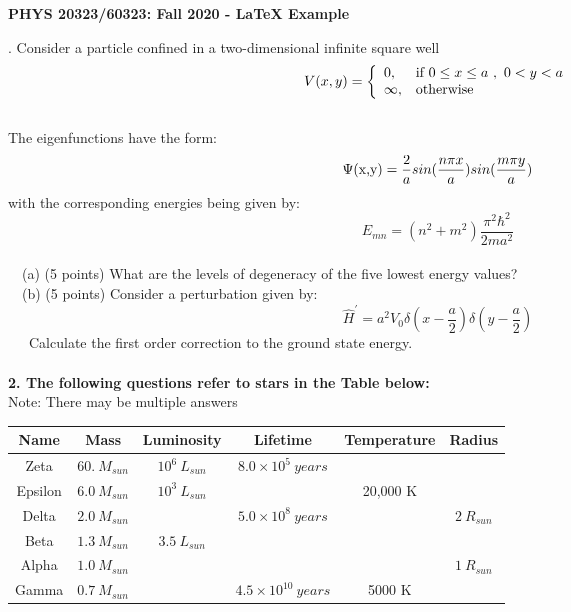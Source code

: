 \documentclass[12pt]{article}
\begin{document}
\def\pos{\medskip\quad}
\def\subpos{\smallskip \qquad}
\begin{center}
{\large\bf
PHYS 20323/60323: Fall 2020 - LaTeX Example}\\
\end{center}

.  Consider a particle confined in a two-dimensional infinite square well        %
\[                     
{V}(x,y) = \left\{
			\begin{array}{ll}
                  		\textnormal{0,} & \textnormal{if} \ 0 \le {x}\le {a} \ , \  0 < y < a\\
                 		\infty, & \textnormal{otherwise}
                \end{array}             
    \right.
\]
\\
\indent The eigenfunctions have the form:\\
\[
\Psi \textnormal{(x,y)} = \frac{2}{a}sin(\frac{n\pi x}{a})sin(\frac{m\pi y}{a})\\
\]
\indent with the corresponding energies being given by:\\
\[
E_{mn} = (n^{2} + m^{2})\frac{\pi ^{2} \hbar ^{2}}{2ma^{2}}
\]
\\
\indent \ \ (a) (5 points) What are the levels of degeneracy of the five lowest energy values?     \   %
\\    
\indent \ \ (b) (5 points) Consider a  perturbation given by:     \\
\[
\hat{H}^\prime = a^{2}V_{0}\delta(x-\frac{a}{2})\delta(y-\frac{a}{2})
\]                   
\indent \ \ \ Calculate the first order correction to the ground state energy.
\\
\\
{\noindent\bf 2. The following questions refer to stars in the Table below:\\}  
 \indent Note: There may be multiple answers\\
\indent\begin{tabular}{|c|c|c|c|c|c|}\hline
Name & Mass            & Luminosity         & Lifetime                  & Temperature & Radius \\\hline
Zeta   & $60. \ M_{sun}$ & $10^{6} \ L_{sun}$ & $8.0 \times 10^{5} \ years$ &  \            & \  \\\hline
Epsilon & $6.0 \ M_{sun}$ & $10^{3}\ L_{sun}$ & \ & 20,000 K & \ \\\hline
Delta & $2.0 \ M_{sun}$& \ & $5.0 \times 10^{8} \ years$ & \ & $2 \ R_{sun}$ \\\hline
Beta &$1.3 \ M_{sun}$&$3.5 \ L_{sun}$& \ & \ & \ \\\hline
Alpha&$1.0\  M_{sun}$& \ & \ & \ & $1\ R_{sun}$ \\\hline
Gamma&$0.7 \ M_{sun}$& \ & $4.5 \times 10^{10} \ years$ & 5000 K & \ \\\hline
\end{tabular}
\end{document}
